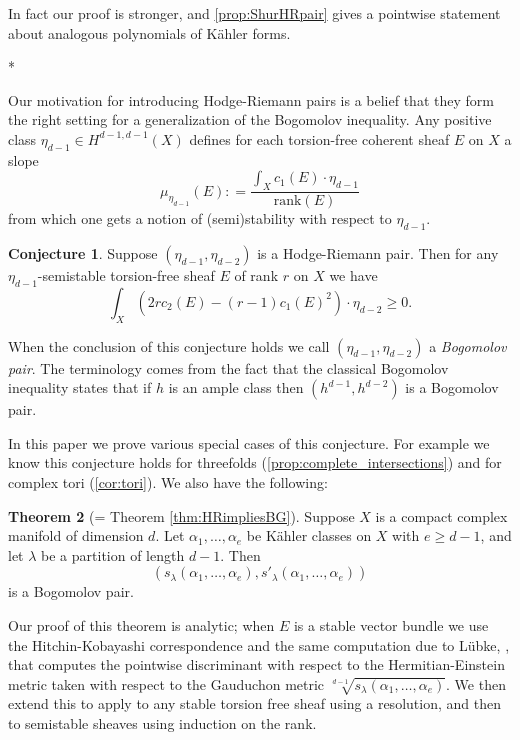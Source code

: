 \documentclass[a4,reqno]{amsart}
\theoremstyle{definition}
\newtheorem{theorem}{Theorem}[section]
\newtheorem{conjecture}[theorem]{Conjecture}
\def\rank{\mbox{rank}}
\numberwithin{equation}{section}
\begin{document}
 In fact our proof is stronger, and \cref{prop:ShurHRpair} gives a pointwise statement about analogous polynomials of K\"ahler forms.
\begin{center}
*
\end{center}

Our motivation for introducing Hodge-Riemann pairs is a belief that they form the right setting for a generalization of the Bogomolov inequality.  Any positive class $\eta_{d-1}\in H^{d-1,d-1}(X)$ defines for each torsion-free coherent sheaf $E$ on $X$ a slope 
$$\mu_{\eta_{d-1}}(E): = \frac{\int_X c_1(E) \cdot \eta_{d-1}}{\rank(E)}$$
from which one gets a notion of  (semi)stability with respect to $\eta_{d-1}$.

\begin{conjecture}
Suppose $(\eta_{d-1},\eta_{d-2})$ is a Hodge-Riemann pair.  Then for any $\eta_{d-1}$-semistable torsion-free sheaf $E$ of rank $r$ on $X$ we have
$$\int_X (2rc_2(E) - (r-1)c_1(E)^2)\cdot \eta_{d-2}\ge 0.$$
\end{conjecture}


When the conclusion of this conjecture holds we call $(\eta_{d-1},\eta_{d-2})$ a \emph{Bogomolov pair}.  The terminology comes from the fact that the classical Bogomolov inequality \cite[Theorem 7.3.1]{HL} states that if $h$ is an ample class then $(h^{d-1},h^{d-2})$ is a Bogomolov pair.

In this paper we prove various special cases of this conjecture. For example we know this conjecture holds for threefolds (\cref{prop:complete_intersections}) and for complex tori (\cref{cor:tori}). We also have the following:

\begin{theorem}[= Theorem \ref{thm:HRimpliesBG}]\label{thm:HRimpliesBG:intro}
Suppose $X$ is a compact complex manifold of dimension $d$.  Let $\alpha_1,\ldots,\alpha_e$ be K\"ahler classes on $X$ with $e\ge d-1$, and let $\lambda$ be a partition of length $d-1$.  Then 
$$(s_{\lambda}(\alpha_1,\ldots,\alpha_e),s'_{\lambda}(\alpha_1,\ldots,\alpha_e))$$
is a Bogomolov pair.
\end{theorem}

Our proof of this theorem is analytic; when $E$ is a stable vector bundle we use the Hitchin-Kobayashi correspondence and the same computation due to L\"ubke, \cite{Luebke}, that computes the pointwise discriminant with respect to the Hermitian-Einstein metric taken with respect to the Gauduchon metric $\sqrt[d-1]{s_{\lambda}(\alpha_1,\ldots,\alpha_e)}.$   We then extend this to apply to any stable torsion free sheaf using a resolution, and then to semistable sheaves using induction on the rank.   
\end{document}
